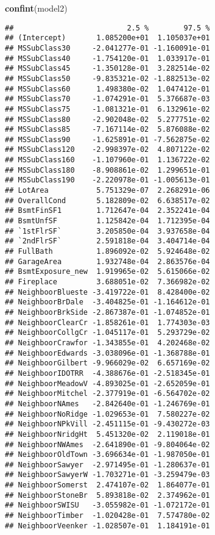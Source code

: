 \documentclass[]{article}
\newenvironment{Shaded}{\begin{snugshade}}{\end{snugshade}}
\newcommand{\KeywordTok}[1]{\textcolor[rgb]{0.13,0.29,0.53}{\textbf{#1}}}
\newcommand{\NormalTok}[1]{#1}
\begin{document}
\begin{Shaded}
\begin{Highlighting}[]
\KeywordTok{confint}\NormalTok{(model2)}
\end{Highlighting}
\end{Shaded}

\begin{verbatim}
##                          2.5 %        97.5 %
## (Intercept)       1.085200e+01  1.105037e+01
## MSSubClass30     -2.041277e-01 -1.160091e-01
## MSSubClass40     -1.754120e-01  1.033917e-01
## MSSubClass45     -1.350128e-01  3.282514e-02
## MSSubClass50     -9.835321e-02 -1.882513e-02
## MSSubClass60      1.498380e-02  1.047412e-01
## MSSubClass70     -1.074291e-01  5.376687e-03
## MSSubClass75     -1.081321e-01  6.132961e-02
## MSSubClass80     -2.902048e-02  5.277751e-02
## MSSubClass85     -7.167114e-02  5.876088e-02
## MSSubClass90     -1.625891e-01 -7.562875e-02
## MSSubClass120    -2.998397e-02  4.807122e-02
## MSSubClass160    -1.107960e-01  1.136722e-02
## MSSubClass180    -8.908861e-02  1.299651e-01
## MSSubClass190    -2.220978e-01 -1.005613e-01
## LotArea           5.751329e-07  2.268291e-06
## OverallCond       5.182809e-02  6.638517e-02
## BsmtFinSF1        1.712647e-04  2.352241e-04
## BsmtUnfSF         1.125842e-04  1.712395e-04
## `1stFlrSF`        3.205850e-04  3.937658e-04
## `2ndFlrSF`        2.591818e-04  3.404714e-04
## FullBath          1.896092e-02  5.924648e-02
## GarageArea        1.932748e-04  2.863576e-04
## BsmtExposure_new  1.919965e-02  5.615066e-02
## Fireplace         3.688051e-02  7.366982e-02
## NeighboorBlueste -3.419722e-01  8.428400e-02
## NeighboorBrDale  -3.404825e-01 -1.164612e-01
## NeighboorBrkSide -2.867387e-01 -1.074852e-01
## NeighboorClearCr -1.858261e-01  1.774303e-03
## NeighboorCollgCr -1.045117e-01  5.293729e-02
## NeighboorCrawfor -1.343855e-01  4.202468e-02
## NeighboorEdwards -3.038096e-01 -1.368788e-01
## NeighboorGilbert -9.966029e-02  6.657169e-02
## NeighboorIDOTRR  -4.388676e-01 -2.518345e-01
## NeighboorMeadowV -4.893025e-01 -2.652059e-01
## NeighboorMitchel -2.377919e-01 -6.564702e-02
## NeighboorNAmes   -2.842640e-01 -1.246769e-01
## NeighboorNoRidge -1.029653e-01  7.580227e-02
## NeighboorNPkVill -2.451115e-01 -9.430272e-03
## NeighboorNridgHt  5.451320e-02  2.119018e-01
## NeighboorNWAmes  -2.641890e-01 -9.804064e-02
## NeighboorOldTown -3.696634e-01 -1.987050e-01
## NeighboorSawyer  -2.971495e-01 -1.280637e-01
## NeighboorSawyerW -1.703271e-01 -3.259479e-03
## NeighboorSomerst  2.474107e-02  1.864077e-01
## NeighboorStoneBr  5.893818e-02  2.374962e-01
## NeighboorSWISU   -3.055982e-01 -1.072172e-01
## NeighboorTimber  -1.020428e-01  7.574780e-02
## NeighboorVeenker -1.028507e-01  1.184191e-01
\end{verbatim}
\end{document}
